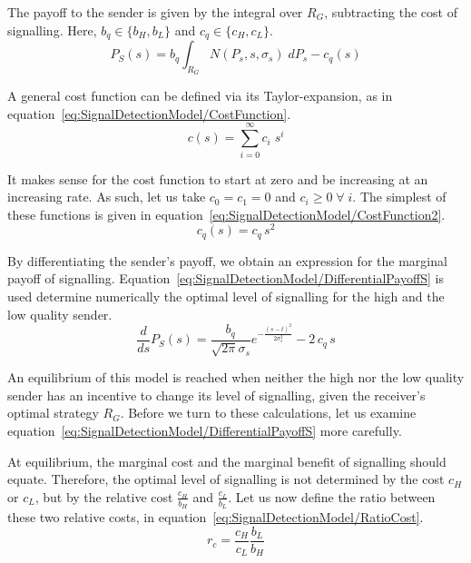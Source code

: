 \documentclass[a4paper,12pt]{article}
\numberwithin{equation}{section}
\begin{document}
The payoff to the sender is given by the integral over $R_{G}$, subtracting the cost of signalling. Here, $b_{q} \in \{b_{H}, b_{L}\}$ and $c_{q} \in \{c_{H}, c_{L}\}$.
\begin{equation}
\label{eq:SignalDetectionModel/PayoffS}
P_{S}(s) = b_{q} \displaystyle \int_{R_{G}} N(P_{s}, s, \sigma_{s}) \; dP_{s}-c_{q}(s)
\end{equation}

A general cost function can be defined via its Taylor-expansion, as in equation~\ref{eq:SignalDetectionModel/CostFunction}.
\begin{equation}
\label{eq:SignalDetectionModel/CostFunction}
c(s)=\sum_{i=0}^{\infty} c_{i} \; s^{i}
\end{equation}

It makes sense for the cost function to start at zero and be increasing at an increasing rate. As such, let us take $c_{0}=c_{1}=0$ and $c_{i} \geq 0 \; \forall \; i$. The simplest of these functions is given in equation~\ref{eq:SignalDetectionModel/CostFunction2}.
\begin{equation}
\label{eq:SignalDetectionModel/CostFunction2}
c_{q}(s)=c_{q} \, s^{2}
\end{equation}

By differentiating the sender's payoff, we obtain an expression for the marginal payoff of signalling. Equation~\ref{eq:SignalDetectionModel/DifferentialPayoffS} is used determine numerically the optimal level of signalling for the high and the low quality sender.
\begin{equation}
\label{eq:SignalDetectionModel/DifferentialPayoffS}
\frac{d}{ds} P_{S}(s) = \frac{b_{q}}{\sqrt{2 \pi} \sigma_{s}} e^{-\frac{(s-t)^2}{2 \sigma_{s}^2}} - 2 \, c_{q} \, s
\end{equation}

An equilibrium of this model is reached when neither the high nor the low quality sender has an incentive to change its level of signalling, given the receiver's optimal strategy $R_{G}$. Before we turn to these calculations, let us examine equation~\ref{eq:SignalDetectionModel/DifferentialPayoffS} more carefully.

At equilibrium, the marginal cost and the marginal benefit of signalling should equate. Therefore, the optimal level of signalling is not determined by the cost $c_{H}$ or $c_{L}$, but by the relative cost $\frac{c_{H}}{b_{H}}$ and $\frac{c_{L}}{b_{L}}$. Let us now define the ratio between these two relative costs, in equation~\ref{eq:SignalDetectionModel/RatioCost}.
\begin{equation}
\label{eq:SignalDetectionModel/RatioCost}
r_{c} = \frac{c_{H}}{c_{L}} \frac{b_{L}}{b_{H}}
\end{equation}
\end{document}
